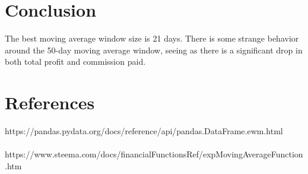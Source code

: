 \documentclass{article}
\begin{document}
\section*{Conclusion}
The best moving average window size is 21 days. There is some strange behavior around the 50-day moving average window, seeing as there is a significant drop in both total profit and commission paid.

\section*{References}
https://pandas.pydata.org/docs/reference/api/pandas.DataFrame.ewm.html
\\\\
https://www.steema.com/docs/financialFunctionsRef/expMovingAverageFunction.htm
\end{document}

